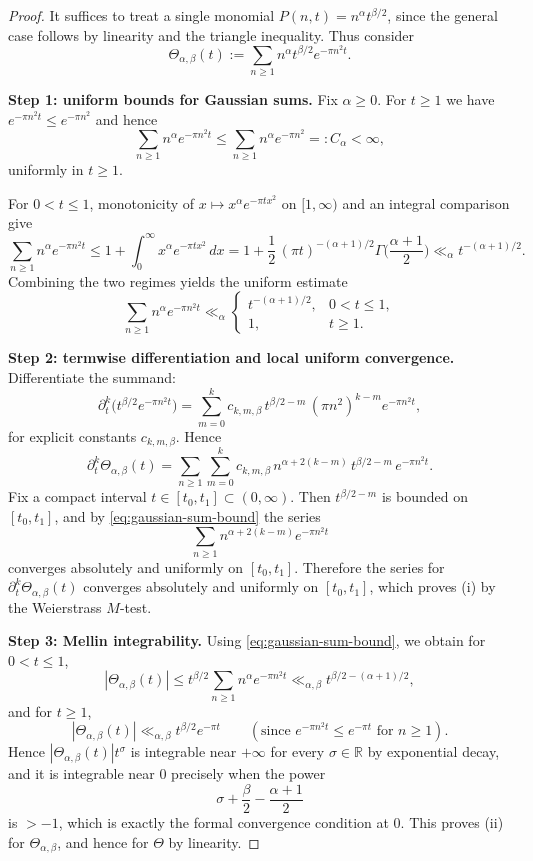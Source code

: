 \documentclass[11pt]{amsart}
\theoremstyle{definition}
\theoremstyle{remark}
\newcommand{\R}{\mathbb{R}}
\begin{document}
\begin{proof}
It suffices to treat a single monomial $P(n,t)=n^{\alpha}t^{\beta/2}$, since the general
case follows by linearity and the triangle inequality. Thus consider
\[
\Theta_{\alpha,\beta}(t):=\sum_{n\ge1} n^{\alpha}t^{\beta/2}e^{-\pi n^2 t}.
\]

\smallskip
\noindent\textbf{Step 1: uniform bounds for Gaussian sums.}
Fix $\alpha\ge0$. For $t\ge1$ we have $e^{-\pi n^2 t}\le e^{-\pi n^2}$ and hence
\[
\sum_{n\ge1} n^{\alpha}e^{-\pi n^2 t}\le \sum_{n\ge1} n^{\alpha}e^{-\pi n^2}=:C_{\alpha}<\infty,
\]
uniformly in $t\ge1$.

For $0<t\le1$, monotonicity of $x\mapsto x^{\alpha}e^{-\pi t x^2}$ on $[1,\infty)$ and an
integral comparison give
\[
\sum_{n\ge1} n^{\alpha}e^{-\pi n^2 t}
\le
1+\int_{0}^{\infty} x^{\alpha}e^{-\pi t x^2}\,dx
=
1+\frac{1}{2}\,(\pi t)^{-(\alpha+1)/2}\Gamma\!\Big(\frac{\alpha+1}{2}\Big)
\ll_{\alpha} t^{-(\alpha+1)/2}.
\]
Combining the two regimes yields the uniform estimate
\begin{equation}\label{eq:gaussian-sum-bound}
\sum_{n\ge1} n^{\alpha}e^{-\pi n^2 t}\ll_{\alpha}
\begin{cases}
t^{-(\alpha+1)/2}, & 0<t\le 1,\\[2pt]
1, & t\ge 1.
\end{cases}
\end{equation}

\smallskip
\noindent\textbf{Step 2: termwise differentiation and local uniform convergence.}
Differentiate the summand:
\[
\partial_t^k\!\bigl(t^{\beta/2}e^{-\pi n^2 t}\bigr)
=
\sum_{m=0}^{k} c_{k,m,\beta}\, t^{\beta/2-m}\,(\pi n^2)^{k-m}e^{-\pi n^2 t},
\]
for explicit constants $c_{k,m,\beta}$. Hence
\[
\partial_t^k\Theta_{\alpha,\beta}(t)
=
\sum_{n\ge1}\sum_{m=0}^{k} c_{k,m,\beta}\, n^{\alpha+2(k-m)}\, t^{\beta/2-m}\,e^{-\pi n^2 t}.
\]
Fix a compact interval $t\in[t_0,t_1]\subset(0,\infty)$. Then $t^{\beta/2-m}$ is bounded on
$[t_0,t_1]$, and by \eqref{eq:gaussian-sum-bound} the series
\[
\sum_{n\ge1} n^{\alpha+2(k-m)}e^{-\pi n^2 t}
\]
converges absolutely and uniformly on $[t_0,t_1]$. Therefore the series for
$\partial_t^k\Theta_{\alpha,\beta}(t)$ converges absolutely and uniformly on $[t_0,t_1]$,
which proves (i) by the Weierstrass $M$-test.

\smallskip
\noindent\textbf{Step 3: Mellin integrability.}
Using \eqref{eq:gaussian-sum-bound}, we obtain for $0<t\le1$,
\[
|\Theta_{\alpha,\beta}(t)|
\le
t^{\beta/2}\sum_{n\ge1}n^{\alpha}e^{-\pi n^2 t}
\ll_{\alpha,\beta}
t^{\beta/2-(\alpha+1)/2},
\]
and for $t\ge1$,
\[
|\Theta_{\alpha,\beta}(t)|
\ll_{\alpha,\beta}
t^{\beta/2}e^{-\pi t}
\qquad
(\text{since }e^{-\pi n^2 t}\le e^{-\pi t} \text{ for }n\ge1).
\]
Hence $|\Theta_{\alpha,\beta}(t)|t^{\sigma}$ is integrable near $+\infty$ for every $\sigma\in\R$
by exponential decay, and it is integrable near $0$ precisely when the power
\[
\sigma+\frac{\beta}{2}-\frac{\alpha+1}{2}
\]
is $>-1$, which is exactly the formal convergence condition at $0$.
This proves (ii) for $\Theta_{\alpha,\beta}$, and hence for $\Theta$ by linearity.
\end{proof}
\end{document}

